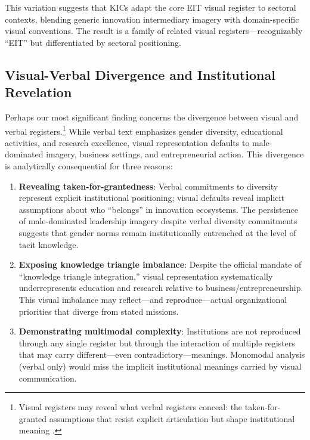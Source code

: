 \documentclass[../main.tex]{subfiles}
\begin{document}
This variation suggests that KICs adapt the core EIT visual register to sectoral contexts, blending generic innovation intermediary imagery with domain-specific visual conventions. The result is a family of related visual registers---recognizably ``EIT'' but differentiated by sectoral positioning.

\subsection{Visual-Verbal Divergence and Institutional Revelation}

Perhaps our most significant finding concerns the divergence between visual and verbal registers.\footnote{Visual registers may reveal what verbal registers conceal: the taken-for-granted assumptions that resist explicit articulation but shape institutional meaning \cite{jancsary2018institutions}.} While verbal text emphasizes gender diversity, educational activities, and research excellence, visual representation defaults to male-dominated imagery, business settings, and entrepreneurial action. This divergence is analytically consequential for three reasons:

\begin{enumerate}
    \item \textbf{Revealing taken-for-grantedness}: Verbal commitments to diversity represent explicit institutional positioning; visual defaults reveal implicit assumptions about who ``belongs'' in innovation ecosystems. The persistence of male-dominated leadership imagery despite verbal diversity commitments suggests that gender norms remain institutionally entrenched at the level of tacit knowledge.

    \item \textbf{Exposing knowledge triangle imbalance}: Despite the official mandate of ``knowledge triangle integration,'' visual representation systematically underrepresents education and research relative to business/entrepreneurship. This visual imbalance may reflect---and reproduce---actual organizational priorities that diverge from stated missions.

    \item \textbf{Demonstrating multimodal complexity}: Institutions are not reproduced through any single register but through the interaction of multiple registers that may carry different---even contradictory---meanings. Monomodal analysis (verbal only) would miss the implicit institutional meanings carried by visual communication.
\end{enumerate}
\end{document}
